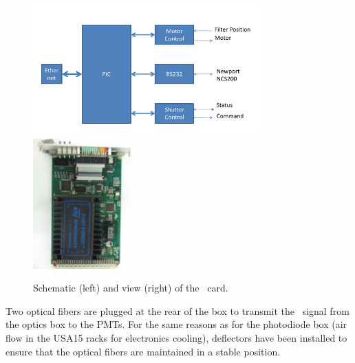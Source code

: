 \begin{itemize}
\begin{figure}[htbp]
\centering
\includegraphics[height=5cm]{figures/licmot_scheme.pdf}
\includegraphics[height=5cm]{figures/licmot.JPG}
\caption{Schematic (left) and view (right) of the \licmot~card.}\label{fig:laslicmot}
\end{figure}

\end{itemize}

Two optical fibers are plugged at the rear of the box to transmit the \laser~signal from the optics box to the PMTs. For the same reasons as for the photodiode box (air flow in the USA15 racks for electronics cooling), deflectors have been installed to ensure that the optical fibers are maintained in a stable position.

